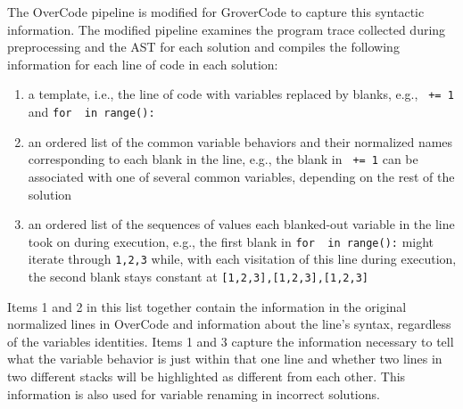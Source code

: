 The OverCode pipeline is modified for GroverCode to capture this syntactic information. The modified pipeline examines the program trace collected during preprocessing and the AST for each solution and compiles the following information for each line of code in each solution:
\begin{enumerate}
\item a template, i.e., the line of code with variables replaced by blanks, e.g., \texttt{\underline{\hspace{1em}} += 1} and \texttt{for \underline{\hspace{1em}} in range(\underline{\hspace{1em}}):}
\item an ordered list of the common variable behaviors and their normalized names corresponding to each blank in the line, e.g., the blank in \texttt{\underline{\hspace{1em}} += 1} can be associated with one of several common variables, depending on the rest of the solution
\item an ordered list of the sequences of values each blanked-out variable in the line took on during execution, e.g., the first blank in \texttt{for \underline{\hspace{1em}} in range(\underline{\hspace{1em}}):} might iterate through \texttt{1,2,3} while, with each visitation of this line during execution, the second blank stays constant at \texttt{[1,2,3],[1,2,3],[1,2,3]}
\end{enumerate}
Items 1 and 2 in this list together contain the information in the original normalized lines in OverCode and information about the line's syntax, regardless of the variables identities. Items 1 and 3 capture the information necessary to tell what the variable behavior is just within that one line and whether two lines in two different stacks will be highlighted as different from each other. This information is also used for variable renaming in incorrect solutions.

